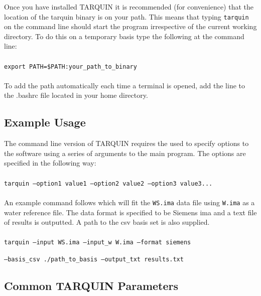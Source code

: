 \documentclass[a4paper,12pt]{article}
\begin{document}
Once you have installed TARQUIN it is recommended (for convenience) that the location of the tarquin binary is on your path.  This means that typing \texttt{tarquin} on the command line should start the program irrespective of the current working directory.  To do this on a temporary basis type the following at the command line:
\\
\\
\texttt{export PATH=\$PATH:your\_path\_to\_binary}
\\
\\
To add the path automatically each time a terminal is opened, add the line to the .bashrc file located in your home directory.


\subsection{Example Usage}
The command line version of TARQUIN requires the used to specify options to the software using a series of arguments to the main program.  The options are specified in the following way:
\\
\\
\noindent
\texttt{tarquin ---option1 value1 ---option2 value2 ---option3 value3...}
\\
\\
An example command follows which will fit the \texttt{WS.ima} data file using \texttt{W.ima} as a water reference file.  The data format is specified to be Siemens ima and a text file of results is outputted.  A path to the csv basis set is also supplied.
\\
\\
\noindent
\texttt{tarquin ---input WS.ima ---input\_w W.ima ---format siemens}

\noindent
\texttt{---basis\_csv .\//path\_to\_basis ---output\_txt results.txt}
\subsection{Common TARQUIN Parameters}
\end{document}
